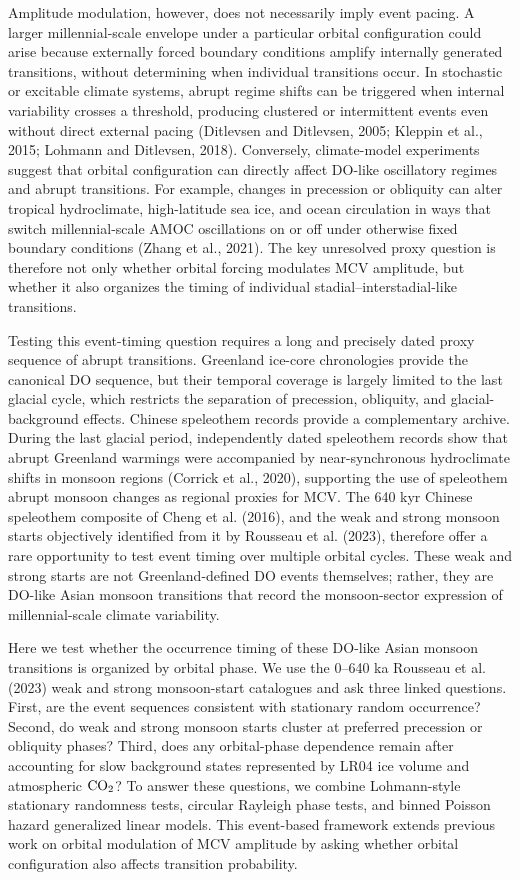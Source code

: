 \documentclass[11pt]{article}
\begin{document}
Amplitude modulation, however, does not necessarily imply event pacing. A larger millennial-scale envelope under a particular orbital configuration could arise because externally forced boundary conditions amplify internally generated transitions, without determining when individual transitions occur. In stochastic or excitable climate systems, abrupt regime shifts can be triggered when internal variability crosses a threshold, producing clustered or intermittent events even without direct external pacing (Ditlevsen and Ditlevsen, 2005; Kleppin et al., 2015; Lohmann and Ditlevsen, 2018). Conversely, climate-model experiments suggest that orbital configuration can directly affect DO-like oscillatory regimes and abrupt transitions. For example, changes in precession or obliquity can alter tropical hydroclimate, high-latitude sea ice, and ocean circulation in ways that switch millennial-scale AMOC oscillations on or off under otherwise fixed boundary conditions (Zhang et al., 2021). The key unresolved proxy question is therefore not only whether orbital forcing modulates MCV amplitude, but whether it also organizes the timing of individual stadial--interstadial-like transitions.

Testing this event-timing question requires a long and precisely dated proxy sequence of abrupt transitions. Greenland ice-core chronologies provide the canonical DO sequence, but their temporal coverage is largely limited to the last glacial cycle, which restricts the separation of precession, obliquity, and glacial-background effects. Chinese speleothem records provide a complementary archive. During the last glacial period, independently dated speleothem records show that abrupt Greenland warmings were accompanied by near-synchronous hydroclimate shifts in monsoon regions (Corrick et al., 2020), supporting the use of speleothem abrupt monsoon changes as regional proxies for MCV. The 640 kyr Chinese speleothem composite of Cheng et al. (2016), and the weak and strong monsoon starts objectively identified from it by Rousseau et al. (2023), therefore offer a rare opportunity to test event timing over multiple orbital cycles. These weak and strong starts are not Greenland-defined DO events themselves; rather, they are DO-like Asian monsoon transitions that record the monsoon-sector expression of millennial-scale climate variability.

Here we test whether the occurrence timing of these DO-like Asian monsoon transitions is organized by orbital phase. We use the 0--640 ka Rousseau et al. (2023) weak and strong monsoon-start catalogues and ask three linked questions. First, are the event sequences consistent with stationary random occurrence? Second, do weak and strong monsoon starts cluster at preferred precession or obliquity phases? Third, does any orbital-phase dependence remain after accounting for slow background states represented by LR04 ice volume and atmospheric \(\ce{CO2}\)? To answer these questions, we combine Lohmann-style stationary randomness tests, circular Rayleigh phase tests, and binned Poisson hazard generalized linear models. This event-based framework extends previous work on orbital modulation of MCV amplitude by asking whether orbital configuration also affects transition probability.
\end{document}
